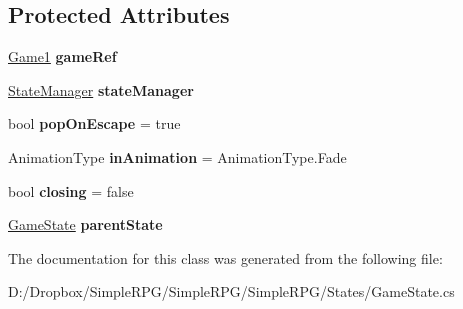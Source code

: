 \subsection*{Protected Attributes}
\begin{DoxyCompactItemize}
\item 
\hypertarget{class_simple_r_p_g_1_1_states_1_1_game_state_abebc6e51f9c375485bc03185a466fe4b}{\hyperlink{class_simple_r_p_g_1_1_game1}{Game1} {\bfseries game\+Ref}}\label{class_simple_r_p_g_1_1_states_1_1_game_state_abebc6e51f9c375485bc03185a466fe4b}

\item 
\hypertarget{class_simple_r_p_g_1_1_states_1_1_game_state_a7ede7a30255b2894fee92cd3dcb9b5fe}{\hyperlink{class_simple_r_p_g_1_1_states_1_1_state_manager}{State\+Manager} {\bfseries state\+Manager}}\label{class_simple_r_p_g_1_1_states_1_1_game_state_a7ede7a30255b2894fee92cd3dcb9b5fe}

\item 
\hypertarget{class_simple_r_p_g_1_1_states_1_1_game_state_ada3000d2cec329e802a0693e2a2a8281}{bool {\bfseries pop\+On\+Escape} = true}\label{class_simple_r_p_g_1_1_states_1_1_game_state_ada3000d2cec329e802a0693e2a2a8281}

\item 
\hypertarget{class_simple_r_p_g_1_1_states_1_1_game_state_a03c7c40f61ca5893d6e5a106e9d9d5a8}{Animation\+Type {\bfseries in\+Animation} = Animation\+Type.\+Fade}\label{class_simple_r_p_g_1_1_states_1_1_game_state_a03c7c40f61ca5893d6e5a106e9d9d5a8}

\item 
\hypertarget{class_simple_r_p_g_1_1_states_1_1_game_state_a3cb05ec585e6744764a94f160efe05ab}{bool {\bfseries closing} = false}\label{class_simple_r_p_g_1_1_states_1_1_game_state_a3cb05ec585e6744764a94f160efe05ab}

\item 
\hypertarget{class_simple_r_p_g_1_1_states_1_1_game_state_a24084ddfaff8f9469c7432fb4be05a1e}{\hyperlink{class_simple_r_p_g_1_1_states_1_1_game_state}{Game\+State} {\bfseries parent\+State}}\label{class_simple_r_p_g_1_1_states_1_1_game_state_a24084ddfaff8f9469c7432fb4be05a1e}

\end{DoxyCompactItemize}


The documentation for this class was generated from the following file\+:\begin{DoxyCompactItemize}
\item 
D\+:/\+Dropbox/\+Simple\+R\+P\+G/\+Simple\+R\+P\+G/\+Simple\+R\+P\+G/\+States/Game\+State.\+cs\end{DoxyCompactItemize}
